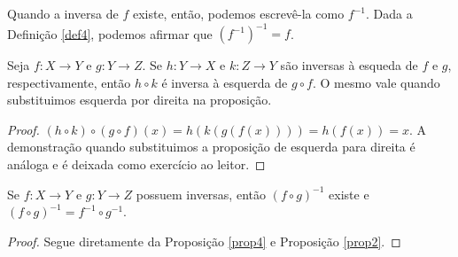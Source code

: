 Quando a inversa de $f$ existe, então, podemos escrevê-la como $f^{-1}$. Dada a Definição \ref{def4}, 
podemos afirmar que $(f^{-1})^{-1} = f$.  

\begin{theorem}
     \label{prop4}
     Seja $f: X \to Y $ e $g: Y \to Z$. Se $h: Y \to X$ e $k: Z \to Y$ são inversas à esqueda de $f$ e $g$, 
     respectivamente, então $h \circ k$ é inversa à esquerda de $g \circ f$. O mesmo vale quando substituimos
     esquerda por direita na proposição. 
\end{theorem}

\begin{proof}
 $(h \circ k)\circ(g \circ f)(x) = h(k(g(f(x)))) = h(f(x)) = x $. A demonstração quando substituimos a proposição
 de esquerda para direita é análoga e é deixada como exercício ao leitor.
\end{proof}

\begin{corollary}
    \label{cor1}
    Se $f: X \to Y$ e $g: Y \to Z$ possuem inversas, então $(f \circ g)^{-1}$ existe e 
    $(f \circ g)^{-1} = f^{-1} \circ g^{-1}$.
\end{corollary}

\begin{proof}
    Segue diretamente da Proposição \ref{prop4} e Proposição \ref{prop2}.  
\end{proof}

    